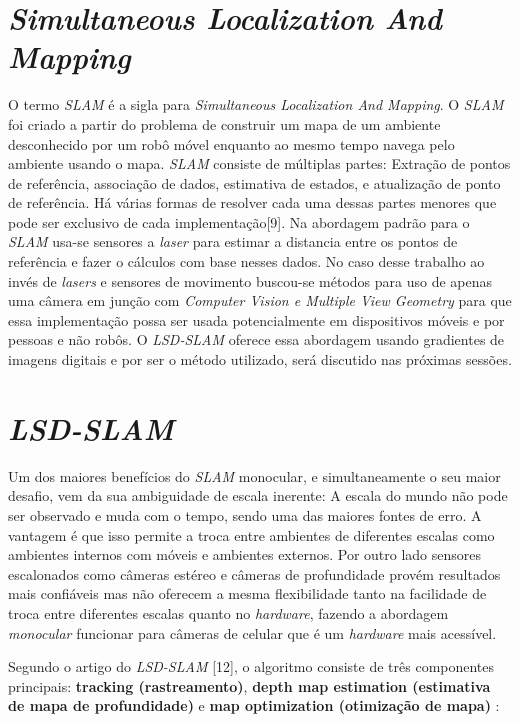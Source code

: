\section{\textit{Simultaneous Localization And Mapping}}

O termo \textit{SLAM} é a sigla para \textit{Simultaneous Localization And Mapping}. O \textit{SLAM} foi criado a partir do problema de construir um mapa de um ambiente desconhecido por um robô móvel enquanto ao mesmo tempo navega pelo ambiente usando o mapa. \textit{SLAM} consiste de múltiplas partes: Extração de pontos de referência, associação de dados, estimativa de estados, e atualização de ponto de referência. Há várias formas de resolver cada uma dessas partes menores que pode ser exclusivo de cada implementação[9]. Na abordagem padrão para o \textit{SLAM} usa-se sensores a \textit{laser} para estimar a distancia entre os pontos de referência e fazer o cálculos com base nesses dados. No caso desse trabalho ao invés de \textit{lasers} e sensores de movimento buscou-se métodos para uso de apenas uma câmera em junção com \textit{Computer Vision e Multiple View Geometry} para que essa implementação possa ser usada potencialmente em dispositivos móveis e por pessoas e não robôs. O \textit{LSD-SLAM} oferece essa abordagem usando gradientes de imagens digitais e por ser o método utilizado, será discutido nas próximas sessões.

\section{\textit{LSD-SLAM}}

Um dos maiores benefícios do \textit{SLAM} monocular, e simultaneamente o seu maior desafio, vem da sua ambiguidade de escala inerente: A escala do mundo não pode ser observado e muda com o tempo, sendo uma das maiores fontes de erro. A vantagem é que isso permite a troca entre ambientes de diferentes escalas como ambientes internos com móveis e ambientes externos. Por outro lado sensores escalonados como câmeras estéreo e câmeras de profundidade provém resultados mais confiáveis mas não oferecem a mesma flexibilidade tanto na facilidade de troca entre diferentes escalas quanto no \textit{hardware}, fazendo a abordagem \textit{monocular} funcionar para câmeras de celular que é um \textit{hardware} mais acessível. 

Segundo o artigo do \textit{LSD-SLAM} [12], o algoritmo consiste de três componentes principais: \textbf{tracking (rastreamento)}, \textbf{depth map estimation (estimativa de mapa de profundidade)} e \textbf{map optimization (otimização de mapa)} :

